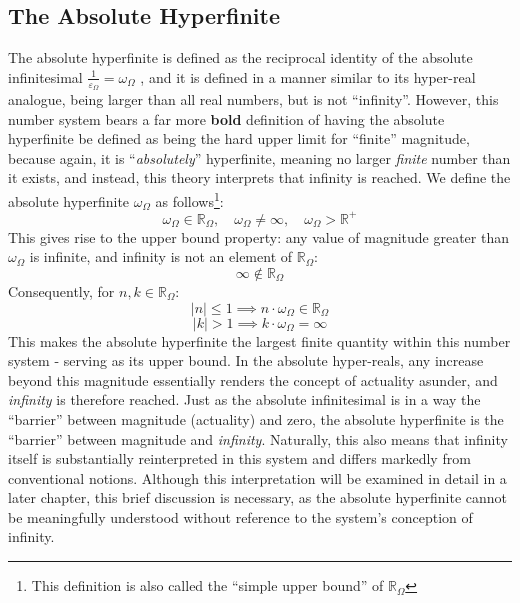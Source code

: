 \documentclass{article}
\begin{document}
\subsection{The Absolute Hyperfinite}
The absolute hyperfinite is defined as the reciprocal identity of the absolute infinitesimal $\frac{1}{\varepsilon_\Omega}=\omega_\Omega$ , and it is defined in a manner similar to its hyper-real analogue, being larger than all real numbers, but is not ``infinity''. However, this number system bears a far more \textbf{bold} definition of having the absolute hyperfinite be defined as being the hard upper limit for “finite” magnitude, because again, it is ``\textit{absolutely}'' hyperfinite, meaning no larger \textit{finite} number than it exists, and instead, this theory interprets that infinity is reached. We define the absolute hyperfinite $\omega_\Omega$ as follows\footnote{This definition is also called the ``simple upper bound'' of $\mathbb{R}_\Omega$}:
$$\omega_\Omega \in \mathbb{R}_\Omega, \quad \omega_\Omega \neq \infty, \quad \omega_\Omega > \mathbb{R}^+$$
This gives rise to the upper bound property: any value of magnitude greater than $\omega_\Omega$ is infinite, and infinity is not an element of $\mathbb{R}_\Omega$:
$$\infty \notin \mathbb{R}_\Omega$$
Consequently, for $n, k \in \mathbb{R}_\Omega$:
$$|n| \leq 1 \implies n \cdot \omega_\Omega \in \mathbb{R}_\Omega$$
$$|k| > 1 \implies k \cdot \omega_\Omega = \infty$$
This makes the absolute hyperfinite the largest finite quantity within this number system - serving as its upper bound. In the absolute hyper-reals, any increase beyond this magnitude essentially renders the concept of actuality asunder, and \textit{infinity} is therefore reached. Just as the absolute infinitesimal is in a way the ``barrier'' between magnitude (actuality) and zero, the absolute hyperfinite is the ``barrier'' between magnitude and \textit{infinity}. Naturally, this also means that infinity itself is substantially reinterpreted in this system and differs markedly from conventional notions. Although this interpretation will be examined in detail in a later chapter, this brief discussion is necessary, as the absolute hyperfinite cannot be meaningfully understood without reference to the system's conception of infinity. \\
\end{document}
